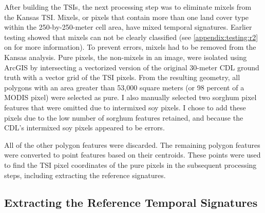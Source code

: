 After building the TSIs, the next processing step was to eliminate mixels from the Kansas TSI. Mixels, or pixels that contain more than one land cover type within the 250-by-250-meter cell area, have mixed temporal signatures. Earlier testing showed that mixels can not be clearly classified (see \autoref{appendix:testing:r2} on  for more information). To prevent errors, mixels had to be removed from the Kansas analysis. Pure pixels, the non-mixels in an image, were isolated using ArcGIS \autocite{arcgis10.1} by intersecting a vectorized version of the original 30-meter CDL ground truth with a vector grid of the TSI pixels. From the resulting geometry, all polygons with an area greater than 53,000 square meters (or 98 percent of a MODIS pixel) were selected as pure. I also manually selected two sorghum pixel features that were omitted due to intermixed soy pixels. I chose to add these pixels due to the low number of sorghum features retained, and because the CDL's intermixed soy pixels appeared to be errors.

All of the other polygon features were discarded. The remaining polygon features were converted to point features based on their centroids. These points were used to find the TSI pixel coordinates of the pure pixels in the subsequent processing steps, including extracting the reference signatures. 

\subsection{Extracting the Reference Temporal Signatures}
\label{methods:sigextraction}

